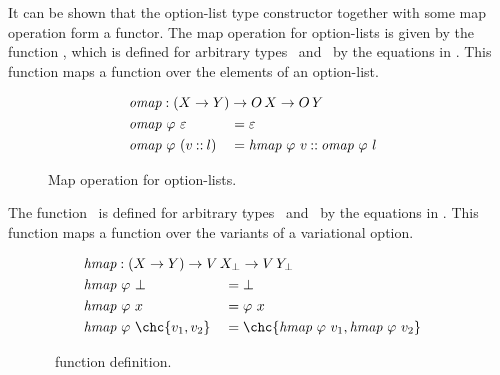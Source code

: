 
It can be shown that the option-list type constructor \OLst[(\cdot)] together with some map operation form a functor.
The map operation for option-lists is given by the function \omap, which is defined for arbitrary types \Val\ and \ValY\ by the equations in .
This function maps a function over the elements of an option-list.

\begin{figure}[H]
  \onehalfspacing
  \begin{alignat*}{2}
    &\mathrlap{\omap : (\Val \to \ValY) \to \OLst \to \OLst[\ValY]} \\
    &\omap\ \varphi\ \nil &&= \nil \\
    &\omap\ \varphi\ (\var \cons \lst)
    &&= \hmap\ \varphi\ \var \cons \omap\ \varphi\ \lst
  \end{alignat*}
  \caption{Map operation for option-lists.}
  \label{fig:omap}
\end{figure}

The function \hmap\ is defined for arbitrary types \Val\ and \ValY\ by the equations in .
This function maps a function over the variants of a variational option.

\begin{figure}[H]
  \onehalfspacing
  \begin{alignat*}{2}
    &\mathrlap{\hmap : (\Val \to \ValY) \to \Var \to \VarY} \\
    &\hmap\ \varphi\ \Bot &&= \Bot \\
    &\hmap\ \varphi\ \val &&= \varphi\ \val \\
    &\hmap\ \varphi\ \chc{\var_1, \var_2}
    &&= \chc{\hmap\ \varphi\ \var_1, \hmap\ \varphi\ \var_2}
  \end{alignat*}
  \caption{\hmap\ function definition.}
  \label{fig:vmap}
\end{figure}


